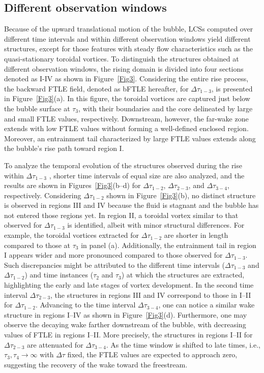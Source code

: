 \documentclass[aps,prfluids,reprint,nofootinbib,onecolumn,groupedaddress,showkeys]{revtex4-2}
\begin{document}
	\subsection{Different observation windows}
	\label{Different observation windows}
	
	Because of the upward translational motion of the bubble, LCSs computed over different time intervals and within different observation windows yield different structures, except for those features with steady flow characteristics such as the quasi-stationary toroidal vortices. To distinguish the structures obtained at different observation windows, the rising domain is divided into four sections denoted as I-IV as shown in Figure~\ref{Fig3}. Considering the entire rise process, the backward FTLE field, denoted as bFTLE hereafter, for $\Delta\tau_{1-3}$, is presented in Figure~\ref{Fig3}(a). In this figure, the toroidal vortices are captured just below the bubble surface at $\tau_3$, with their boundaries and the core delineated by large and small FTLE values, respectively. Downstream, however, the far-wake zone extends with low FTLE values without forming a well-defined enclosed region. Moreover, an entrainment tail characterized by large FTLE values extends along the bubble’s rise path toward region I. 
	
	To analyze the temporal evolution of the structures observed during the rise within $\Delta\tau_{1-3}$ , shorter time intervals of equal size are also analyzed, and the results are shown in Figures~\ref{Fig3}(b–d) for $\Delta\tau_{1-2}$, $\Delta\tau_{2-3}$, and $\Delta\tau_{3-4}$, respectively. Considering $\Delta\tau_{1-2}$ shown in Figure~\ref{Fig3}(b), no distinct structure is observed in regions III and IV because the fluid is stagnant and the bubble has not entered those regions yet. In region II, a toroidal vortex similar to that observed for $\Delta\tau_{1-3}$ is identified, albeit with minor structural differences. For example, the toroidal vortices extracted for $\Delta\tau_{1-2}$ are shorter in length compared to those at $\tau_{3}$ in panel (a). Additionally, the entrainment tail in region I appears wider and more pronounced compared to those observed for $\Delta\tau_{1-3}$. Such discrepancies might be attributed to the different time intervals ($\Delta\tau_{1-3}$ and $\Delta\tau_{1-2}$) and time instances ($\tau_2$ and $\tau_3$) at which the structures are extracted, highlighting the early and late stages of vortex development. In the second time interval $\Delta\tau_{2-3}$, the structures in regions III and IV correspond to those in I–II for $\Delta\tau_{1-2}$. Advancing to the time interval $\Delta\tau_{3-4}$, one can notice a similar wake structure in regions I–IV as shown in Figure~\ref{Fig3}(d). Furthermore, one may observe the decaying wake farther downstream of the bubble, with decreasing values of FTLE in regions I–II. More precisely, the structures in regions I–II for $\Delta\tau_{2-3}$ are attenuated for $\Delta\tau_{3-4}$. As the time window is shifted to late times, i.e., $\tau_{3}, \tau_{4} \rightarrow \infty$ with $\Delta\tau$ fixed, the FTLE values are expected to approach zero, suggesting the recovery of the wake toward the freestream.
	
\end{document}
